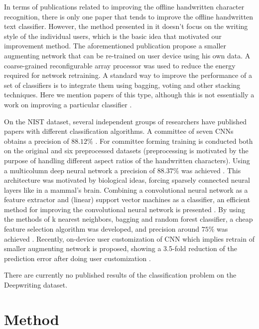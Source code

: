 \documentclass{article}
\begin{document}
In terms of publications related to improving the offline handwritten character recognition, 
there is only one paper that tends to improve the offline handwritten text classifier. 
However, the method presented in it doesn't focus on the writing style of the individual users, which is the basic idea that motivated our improvement method. 
The aforementioned publication \citet{nist5} propose a smaller augmenting network that can be re-trained on user device using his own data. %
A coarse-grained reconfigurable array processor was used to reduce the energy required for network retraining. 
A standard way to improve the performance of a set of classifiers is to integrate them using bagging, voting and other stacking techniques. 
Here we mention papers of this type, although this is not essentially a work on improving a particular classifier \citet{imp1} \citet{imp2} \citet{imp3}. 

On the NIST dataset, several independent groups of researchers have published papers with different classification algorithms. 
A committee of seven CNNs obtains a precision of $88.12\%$ \citet{nist1}. 
For committee forming training is conducted both on the original and six preprocessed datasets 
(preprocessing is motivated by the purpose of handling different aspect ratios of the handwritten characters). 
Using a multicolumn deep neural network a precision of $88.37\%$ was achieved \citet{nist2}. 
This architecture was motivated by biological ideas, forcing sparsely connected neural layers like in a mammal's brain. 
Combining a convolutional neural network as a feature extractor and (linear) support vector machines as a classifier, 
an efficient method for improving the convolutional neural network is presented \cite{nist3}. 
By using the methods of k nearest neighbors, bagging and random forest classifier, a cheap feature selection algorithm was developed, 
and precision around $75\%$ was achieved \citet{nist4}. 
Recently, on-device user customization of CNN which implies retrain of smaller augmenting network is proposed, 
showing a 3.5-fold reduction of the prediction error after doing user customization \citet{nist5}. 

There are currently no published results of the classification problem on the Deepwriting dataset. 

\section{Method}
\end{document}
